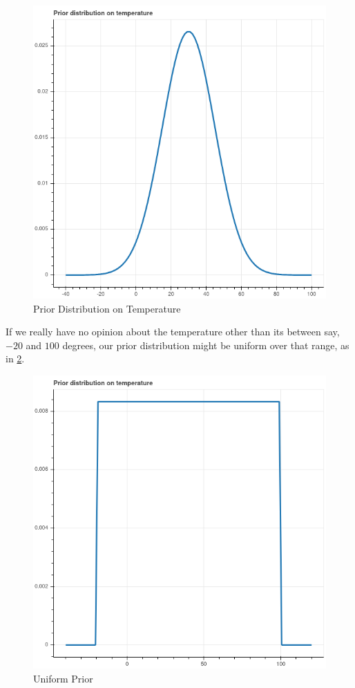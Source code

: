 \documentclass[
  oneside]{scrbook}
\begin{document}
\begin{figure}
\hypertarget{fig:tempprior}{%
\centering
\includegraphics{img/prior.png}
\caption{Prior Distribution on Temperature}\label{fig:tempprior}
}
\end{figure}

If we really have no opinion about the temperature other than its
between say, \(-20\) and \(100\) degrees, our prior distribution might
be uniform over that range, as in \cref{fig:uniformprior}.

\begin{figure}
\hypertarget{fig:uniformprior}{%
\centering
\includegraphics{img/uniform.png}
\caption{Uniform Prior}\label{fig:uniformprior}
}
\end{figure}
\end{document}
